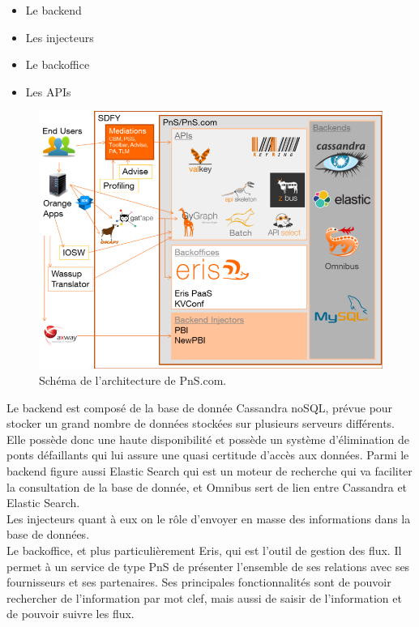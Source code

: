 \begin{itemize}
    \item Le backend
    \item Les injecteurs
    \item Le backoffice
    \item Les APIs
\end{itemize}


\begin{figure}[htp]
  \centering
  \includegraphics[width=15cm]{images/pns/psn.png}
  \caption{Schéma de l'architecture de PnS.com.}
  \label{pns}
\end{figure}


Le backend est composé de la base de donnée Cassandra noSQL, prévue pour stocker un grand nombre de données stockées sur plusieurs serveurs différents. Elle possède donc une haute disponibilité et possède un système d'élimination de ponts défaillants qui lui assure une quasi certitude d'accès aux données. Parmi le backend figure aussi Elastic Search qui est un moteur de recherche qui va faciliter la consultation de la base de donnée, et Omnibus sert de lien entre Cassandra et Elastic Search.\\

Les injecteurs quant à eux on le rôle d'envoyer en masse des informations dans la base de données.\\

Le backoffice, et plus particulièrement Eris, qui est l'outil de gestion des flux. Il permet à un service de type PnS de présenter l'ensemble de ses relations avec ses fournisseurs et ses partenaires. Ses principales fonctionnalités sont de pouvoir rechercher de l'information par mot clef, mais aussi de saisir de l'information et de pouvoir suivre les flux.\\

